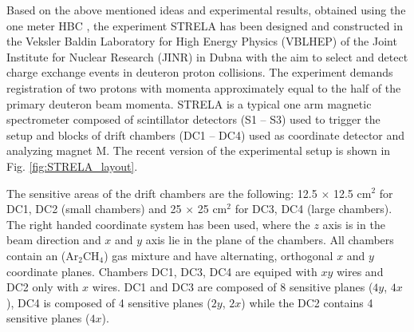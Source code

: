 \documentclass[twocolumn,epjc3]{svjour3}
\begin{document}
Based on the above mentioned ideas and experimental results, obtained using the
one meter HBC \cite{gla02,gla08}, the experiment STRELA has been designed and
constructed in the Veksler Baldin Laboratory for High Energy Physics (VBLHEP) of
the Joint Institute for Nuclear Research (JINR) in Dubna with the aim to select
and detect charge exchange events in deuteron proton collisions. The experiment
demands registration of two protons with momenta approximately equal to the half
of the primary deuteron beam momenta. STRELA is a typical one arm magnetic
spectrometer composed of scintillator detectors (S1 -- S3)
used to trigger the setup
and blocks of drift chambers (DC1 -- DC4) used as coordinate detector and
analyzing magnet M. The recent version of the experimental setup is shown in
Fig. \ref{fig:STRELA_layout}.

The sensitive areas of the drift chambers are the following: 12.5 $\times$ 12.5
cm$^2$ for DC1, DC2 (small chambers) and 25 $\times$ 25 cm$^2$ for DC3, DC4
(large chambers). The right handed coordinate system has been used, where the
$z$ axis is in the beam direction and $x$ and $y$ axis lie in the plane of the
chambers. All chambers contain an (Ar$_2$CH$_4$) gas mixture and have
alternating, orthogonal $x$ and $y$ coordinate planes. Chambers DC1, DC3, DC4
are equiped with $xy$ wires and DC2 only with $x$ wires. DC1 and DC3 are
composed of 8 sensitive planes ($4y$, $4x$), DC4 is composed of 4 sensitive
planes ($2y$, $2x$) while the DC2 contains 4 sensitive planes ($4x$).
\end{document}
